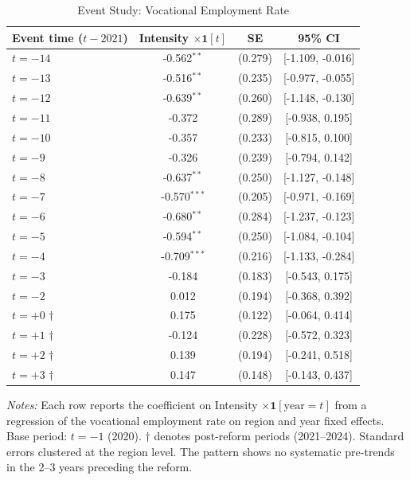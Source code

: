 \begin{table}[H]
\centering
\caption{Event Study: Vocational Employment Rate}
\label{tab:eventstudy}
\begin{threeparttable}
\begin{tabular}{lccc}
\toprule
Event time ($t - 2021$) & Intensity $\times \mathbf{1}[t]$ & SE & 95\% CI \\
\midrule
$t = -14$ & -0.562$^{**}$ & (0.279) & [-1.109, -0.016] \\
$t = -13$ & -0.516$^{**}$ & (0.235) & [-0.977, -0.055] \\
$t = -12$ & -0.639$^{**}$ & (0.260) & [-1.148, -0.130] \\
$t = -11$ & -0.372 & (0.289) & [-0.938, 0.195] \\
$t = -10$ & -0.357 & (0.233) & [-0.815, 0.100] \\
$t = -9$ & -0.326 & (0.239) & [-0.794, 0.142] \\
$t = -8$ & -0.637$^{**}$ & (0.250) & [-1.127, -0.148] \\
$t = -7$ & -0.570$^{***}$ & (0.205) & [-0.971, -0.169] \\
$t = -6$ & -0.680$^{**}$ & (0.284) & [-1.237, -0.123] \\
$t = -5$ & -0.594$^{**}$ & (0.250) & [-1.084, -0.104] \\
$t = -4$ & -0.709$^{***}$ & (0.216) & [-1.133, -0.284] \\
$t = -3$ & -0.184 & (0.183) & [-0.543, 0.175] \\
$t = -2$ & 0.012 & (0.194) & [-0.368, 0.392] \\
$t = +0$ $\dagger$ & 0.175 & (0.122) & [-0.064, 0.414] \\
$t = +1$ $\dagger$ & -0.124 & (0.228) & [-0.572, 0.323] \\
$t = +2$ $\dagger$ & 0.139 & (0.194) & [-0.241, 0.518] \\
$t = +3$ $\dagger$ & 0.147 & (0.148) & [-0.143, 0.437] \\
\bottomrule
\end{tabular}
\begin{tablenotes}[flushleft]
\small
\item \textit{Notes:} Each row reports the coefficient on Intensity $\times \mathbf{1}[\text{year} = t]$ from a regression of the vocational employment rate on region and year fixed effects. Base period: $t = -1$ (2020). $\dagger$ denotes post-reform periods (2021--2024). Standard errors clustered at the region level. The pattern shows no systematic pre-trends in the 2--3 years preceding the reform.
\end{tablenotes}
\end{threeparttable}
\end{table}

